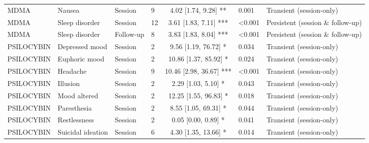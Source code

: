 \begin{table}[htbp]
{\begin{tabular}{llllcll}
    MDMA & Nausea & Session & 9 & 4.02 [1.74, 9.28] ** & 0.001 & Transient (session-only) \\
    MDMA & Sleep disorder & Session & 12 & 3.61 [1.83, 7.11] *** & <0.001 & Persistent (session \& follow-up) \\
    MDMA & Sleep disorder & Follow-up & 8 & 3.83 [1.83, 8.04] *** & <0.001 & Persistent (session \& follow-up) \\
    PSILOCYBIN & Depressed mood & Session & 2 & 9.56 [1.19, 76.72] * & 0.034 & Transient (session-only) \\
    PSILOCYBIN & Euphoric mood & Session & 2 & 10.86 [1.37, 85.92] * & 0.024 & Transient (session-only) \\
    PSILOCYBIN & Headache & Session & 9 & 10.46 [2.98, 36.67] *** & <0.001 & Transient (session-only) \\
    PSILOCYBIN & Illusion & Session & 2 & 2.29 [1.03, 5.10] * & 0.043 & Transient (session-only) \\
    PSILOCYBIN & Mood altered & Session & 2 & 12.25 [1.55, 96.83] * & 0.018 & Transient (session-only) \\
    PSILOCYBIN & Paresthesia & Session & 2 & 8.55 [1.05, 69.31] * & 0.044 & Transient (session-only) \\
    PSILOCYBIN & Restlessness & Session & 2 & 0.05 [0.00, 0.89] * & 0.041 & Transient (session-only) \\
    PSILOCYBIN & Suicidal ideation & Session & 6 & 4.30 [1.35, 13.66] * & 0.014 & Transient (session-only) \\
    \bottomrule
  \end{tabular}}
\end{table}
